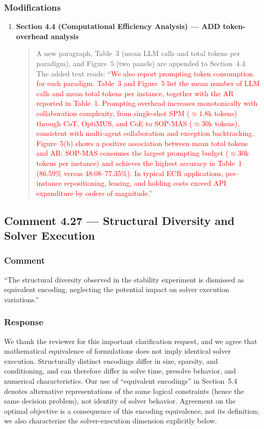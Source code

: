 \documentclass[11pt,a4paper]{article}
\begin{document}
\subsubsection{Modifications}
\begin{enumerate}
\item \textbf{Section 4.4 (Computational Efficiency Analysis) --- ADD token-overhead analysis}
\begin{quote}
A new paragraph, Table~3 (mean LLM calls and total tokens per paradigm), and Figure~5 (two panels) are appended to Section~4.4. The added text reads: ``\textcolor{red}{We also report prompting token consumption for each paradigm. Table~3 and Figure~5 list the mean number of LLM calls and mean total tokens per instance, together with the AR reported in Table~1. Prompting overhead increases monotonically with collaboration complexity, from single-shot SPM (${\approx}1.8$k tokens) through CoT, OptiMUS, and CoE to SOP-MAS (${\approx}30$k tokens), consistent with multi-agent collaboration and exception backtracking. Figure~5(b) shows a positive association between mean total tokens and AR: SOP-MAS consumes the largest prompting budget (${\approx}30$k tokens per instance) and achieves the highest accuracy in Table~1 (86.59\% versus 48.08--77.35\%). In typical ECR applications, per-instance repositioning, leasing, and holding costs exceed API expenditure by orders of magnitude.}''
\end{quote}
\end{enumerate}

\subsection{Comment 4.27 --- Structural Diversity and Solver Execution}

\subsubsection{Comment}
``The structural diversity observed in the stability experiment is dismissed as equivalent encoding, neglecting the potential impact on solver execution variations.''

\subsubsection{Response}
We thank the reviewer for this important clarification request, and we agree that mathematical equivalence of formulations does not imply identical solver execution. Structurally distinct encodings differ in size, sparsity, and conditioning, and can therefore differ in solve time, presolve behavior, and numerical characteristics. Our use of ``equivalent encodings'' in Section~5.4 denotes alternative representations of the same logical constraints (hence the same decision problem), not identity of solver behavior. Agreement on the optimal objective is a consequence of this encoding equivalence, not its definition; we also characterize the solver-execution dimension explicitly below.
\end{document}

